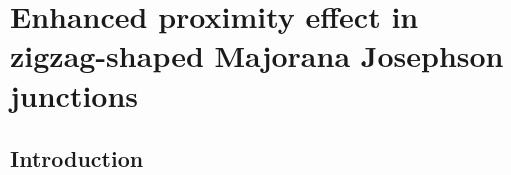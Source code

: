\chapter{Enhanced proximity effect in zigzag-shaped Majorana Josephson junctions}
\label{ch:zigzag}

\newpage
\noindent 
\section{Introduction}

\cite{Beenakker1992} %


